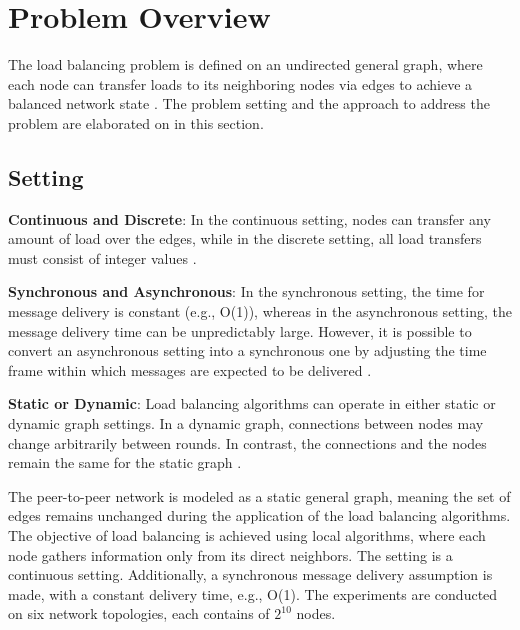 \chapter{Problem Overview}\label{chap:problemoverview}
The load balancing problem is defined on an undirected general graph, where each node can transfer loads to its neighboring nodes via edges to achieve a balanced network state \cite{Dinitz2023DAB}. The problem setting and the approach to address the problem are elaborated on in this section.

\section{Setting}\label{sec:setting}
\textbf{Continuous and Discrete}: In the continuous setting, nodes can transfer any amount of load over the edges, while in the discrete setting, all load transfers must consist of integer values \cite{Dinitz2023DAB}.

\textbf{Synchronous and Asynchronous}:  In the synchronous setting, the time for message delivery is constant (e.g., O(1)), whereas in the asynchronous setting, the message delivery time can be unpredictably large. However, it is possible to convert an asynchronous setting into a synchronous one by adjusting the time frame within which messages are expected to be delivered \cite{Dinitz2023DAB}.

\textbf{Static or Dynamic}: Load balancing algorithms can operate in either static or dynamic graph settings. In a dynamic graph, connections between nodes may change arbitrarily between rounds. In contrast, the connections and the nodes remain the same for the static graph \cite{Dinitz2023DAB}.

The peer-to-peer network is modeled as a static general graph, meaning the set of edges remains unchanged during the application of the load balancing algorithms. The objective of load balancing is achieved using local algorithms, where each node gathers information only from its direct neighbors. The setting is a continuous setting. Additionally, a synchronous message delivery assumption is made, with a constant delivery time, e.g., O(1). The experiments are conducted on six network topologies, each contains of $2^{10}$ nodes.


